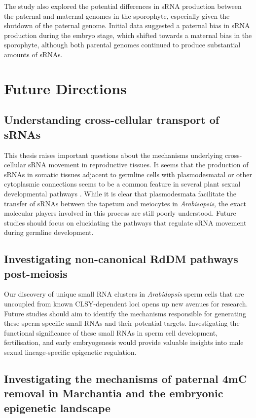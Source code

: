 The study also explored the potential differences in sRNA production between the paternal and maternal genomes in the sporophyte, especially given the shutdown of the paternal genome. Initial data suggested a paternal bias in sRNA production during the embryo stage, which shifted towards a maternal bias in the sporophyte, although both parental genomes continued to produce substantial amounts of sRNAs.

\section{Future Directions}

\subsection{Understanding cross-cellular transport of sRNAs}

This thesis raises important questions about the mechanisms underlying cross-cellular sRNA movement in reproductive tissues. It seems that the production of sRNAs in somatic tissues adjacent to germline cells with plasmodesmatal or other cytoplasmic connections seems to be a common feature in several plant sexual developmental pathways \cite{RN187,RN293,RN57,RN235}. While it is clear that plasmodesmata facilitate the transfer of sRNAs between the tapetum and meiocytes in \textit{Arabisopsis}, the exact molecular players involved in this process are still poorly understood. Future studies should focus on elucidating the pathways that regulate sRNA movement during germline development.

\subsection{Investigating non-canonical RdDM pathways post-meiosis}

Our discovery of unique small RNA clusters in \textit{Arabidopsis} sperm cells that are uncoupled from known CLSY-dependent loci opens up new avenues for research. Future studies should aim to identify the mechanisms responsible for generating these sperm-specific small RNAs and their potential targets. Investigating the functional significance of these small RNAs in sperm cell development, fertilisation, and early embryogenesis would provide valuable insights into male sexual lineage-specific epigenetic regulation.

\subsection{Investigating the mechanisms of paternal 4mC removal in Marchantia and the embryonic epigenetic landscape}

